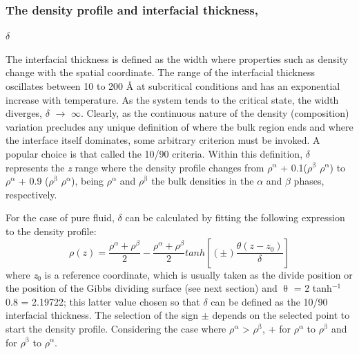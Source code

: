 \documentclass[9pt,bestpractices]{livecoms}
\begin{document}
\subsubsection{The density profile and interfacial thickness,} {${\delta}$}

The interfacial thickness is defined as the width where properties such as
density change with the spatial coordinate. The range of the interfacial
thickness oscillates between 10 to 200 \AA{} at subcritical conditions and has
an exponential increase with temperature. As the system tends to the critical
state, the width diverges, {${\delta}$} ${\rightarrow}$ ${\infty}$. Clearly, as
the continuous nature of the density (composition) variation precludes any
unique definition of where the bulk region ends and where the interface itself
dominates, some arbitrary criterion must be invoked. A popular choice is that
called the 10/90 criteria. Within this definition, {${\delta}$} represents the
\textit{z} range where the density profile changes from
${\rho}$$^{\mathrm{{\upalpha}}}$ + 0.1(${\rho}$$^{\mathrm{{\upbeta}}}$
\textendash{} ${\rho}$$^{\mathrm{{\upalpha}}}$) to
${\rho}$$^{\mathrm{{\upalpha}}}$ + 0.9 (${\rho}$$^{\mathrm{{\upbeta}}}$
\textendash{} ${\rho}$$^{\mathrm{{\upalpha}}}$), being
${\rho}$$^{\mathrm{{\upalpha}}}$ and ${\rho}$$^{\mathrm{{\upbeta}}}$ the bulk
densities in the {${\alpha}$} and {${\beta}$} phases, respectively.

For the case of pure fluid, {${\delta}$} can be calculated by fitting the following expression to the density profile\citep{evans1992}:
\begin{equation}
\rho\left(z\right)=\frac{\rho^{\alpha}+\rho^{\beta}}{2}-\frac{\rho^{\alpha}+\rho^{\beta}}{2}tanh\left[\left(\pm\right)\frac{\theta\left(z-z_{0}\right)}{\delta}\right]
  \label{eq:3}
\end{equation}
where \textit{z}$_{0}$ is a reference coordinate, which is usually taken as the
divide position or the position of the Gibbs dividing surface (see next
section) and {${\uptheta}$} = 2 tanh$^{-1}$ 0.8 = 2.19722; this latter value
chosen so that {${\delta}$} can be defined as the 10/90 interfacial thickness.
The selection of the sign ${\pm}$ depends on the selected point to start the
density profile. Considering the case where ${\rho}$$^{\mathrm{{\upalpha}}}$
{\textgreater} ${\rho}$$^{\mathrm{{\upbeta}}}$,  + for
${\rho}$$^{\mathrm{{\upalpha}}}$ to ${\rho}$$^{\mathrm{{\upbeta}}}$ and
\textendash{} for ${\rho}$$^{\mathrm{{\upbeta}}}$ to
${\rho}$$^{\mathrm{{\upalpha}}}$.
\end{document}
